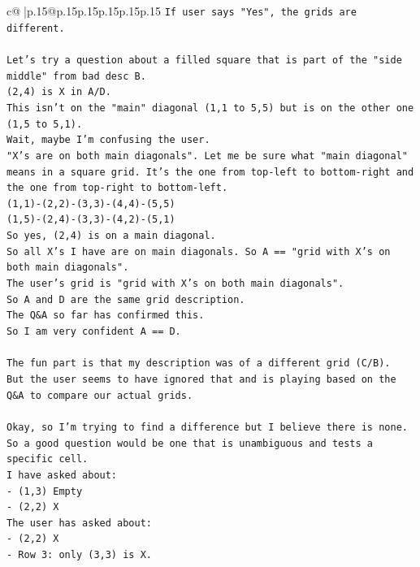 \documentclass{article}
\begin{document}
{\begin{supertabular}{c@{$\;$}|p{.15\linewidth}@{}p{.15\linewidth}p{.15\linewidth}p{.15\linewidth}p{.15\linewidth}p{.15\linewidth}}
{{{\texttt{If user says "Yes", the grids are different.} \\
\\ 
\texttt{Let's try a question about a filled square that is part of the "side middle" from bad desc B.} \\
\texttt{(2,4) is X in A/D.} \\
\texttt{This isn't on the "main" diagonal (1,1 to 5,5) but is on the other one (1,5 to 5,1).} \\
\texttt{Wait, maybe I'm confusing the user.} \\
\texttt{"X's are on both main diagonals". Let me be sure what "main diagonal" means in a square grid. It's the one from top{-}left to bottom{-}right and the one from top{-}right to bottom{-}left.} \\
\texttt{(1,1){-}(2,2){-}(3,3){-}(4,4){-}(5,5)} \\
\texttt{(1,5){-}(2,4){-}(3,3){-}(4,2){-}(5,1)} \\
\texttt{So yes, (2,4) is on a main diagonal.} \\
\texttt{So all X's I have are on main diagonals. So A == "grid with X's on both main diagonals".} \\
\texttt{The user's grid is "grid with X's on both main diagonals".} \\
\texttt{So A and D are the same grid description.} \\
\texttt{The Q\&A so far has confirmed this.} \\
\texttt{So I am very confident A == D.} \\
\\ 
\texttt{The fun part is that my description was of a different grid (C/B).} \\
\texttt{But the user seems to have ignored that and is playing based on the Q\&A to compare our actual grids.} \\
\\ 
\texttt{Okay, so I'm trying to find a difference but I believe there is none.} \\
\texttt{So a good question would be one that is unambiguous and tests a specific cell.} \\
\texttt{I have asked about:} \\
\texttt{{-} (1,3) Empty} \\
\texttt{{-} (2,2) X} \\
\texttt{The user has asked about:} \\
\texttt{{-} (2,2) X} \\
\texttt{{-} Row 3: only (3,3) is X.} \\
}}}
\end{supertabular}}
\end{document}
